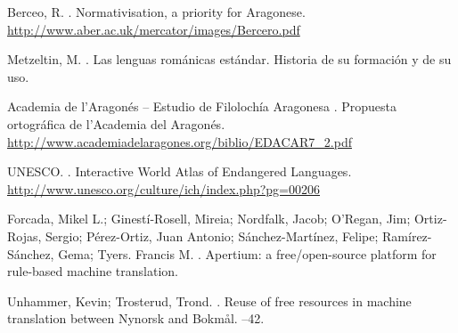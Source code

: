 \documentclass[10pt, a4paper]{article}
\begin{document}
  
  \begin{thebibliography}{}
  
  Berceo, R.
  . 
  \newblock Normativisation, a priority for Aragonese.
  \newblock \url{http://www.aber.ac.uk/mercator/images/Bercero.pdf}








  Metzeltin, M.
  . 
  \newblock Las lenguas románicas estándar. Historia de su formación y de su uso.



 Academia de l'Aragonés -- Estudio de Filolochía Aragonesa
 . 
 \newblock Propuesta ortográfica de l'Academia del Aragonés.
 \newblock \url{http://www.academiadelaragones.org/biblio/EDACAR7_2.pdf}


  UNESCO.
  . 
  \newblock Interactive World Atlas of Endangered Languages.
  \newblock \url{http://www.unesco.org/culture/ich/index.php?pg=00206}








  Forcada, Mikel L.; Ginestí-Rosell, Mireia; Nordfalk, Jacob; O'Regan, Jim; Ortiz-Rojas, Sergio; Pérez-Ortiz, Juan Antonio; Sánchez-Martínez, Felipe; Ramírez-Sánchez, Gema; Tyers. Francis M.
  . 
  \newblock Apertium: a free/open-source platform for rule-based machine translation.
















  Unhammer, Kevin; Trosterud, Trond.
  . 
  \newblock Reuse of free resources in machine translation between Nynorsk and Bokmål.
  --42.





\end{thebibliography}
\end{document}
